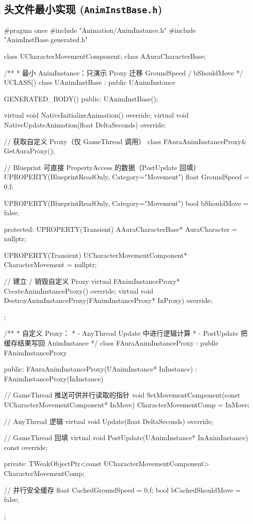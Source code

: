 \documentclass[10pt,openright,oneside,CJKmath]{MyBook}
\begin{document}
\subsection{头文件最小实现 (\texttt{AnimInstBase.h})}
\begin{code}[caption={AnimInstBase.h}]
#pragma once
#include "Animation/AnimInstance.h"
#include "AnimInstBase.generated.h"

class UCharacterMovementComponent;
class AAuraCharacterBase;

/**
 * 最小 AnimInstance：只演示 Proxy 迁移 GroundSpeed / bShouldMove
 */
UCLASS()
class UAnimInstBase : public UAnimInstance
{
    GENERATED_BODY()
public:
    UAnimInstBase();

    virtual void NativeInitializeAnimation() override;
    virtual void NativeUpdateAnimation(float DeltaSeconds) override;

    // 获取自定义 Proxy（仅 GameThread 调用）
    class FAuraAnimInstanceProxy& GetAuraProxy();

    // Blueprint 可直接 PropertyAccess 的数据（PostUpdate 回填）
    UPROPERTY(BlueprintReadOnly, Category="Movement")
    float GroundSpeed = 0.f;

    UPROPERTY(BlueprintReadOnly, Category="Movement")
    bool bShouldMove = false;

protected:
    UPROPERTY(Transient)
    AAuraCharacterBase* AuraCharacter = nullptr;

    UPROPERTY(Transient)
    UCharacterMovementComponent* CharacterMovement = nullptr;

    // 建立 / 销毁自定义 Proxy
    virtual FAnimInstanceProxy* CreateAnimInstanceProxy() override;
    virtual void DestroyAnimInstanceProxy(FAnimInstanceProxy* InProxy) override;
};

/**
 * 自定义 Proxy：
 *  - AnyThread Update 中进行逻辑计算
 *  - PostUpdate 把缓存结果写回 AnimInstance
 */
class FAuraAnimInstanceProxy : public FAnimInstanceProxy
{
public:
    FAuraAnimInstanceProxy(UAnimInstance* InInstance)
        : FAnimInstanceProxy(InInstance) {}

    // GameThread 推送可供并行读取的指针
    void SetMovementComponent(const UCharacterMovementComponent* InMove)
    {
        CharacterMovementComp = InMove;
    }

    // AnyThread 逻辑
    virtual void Update(float DeltaSeconds) override;

    // GameThread 回填
    virtual void PostUpdate(UAnimInstance* InAnimInstance) const override;

private:
    TWeakObjectPtr<const UCharacterMovementComponent> CharacterMovementComp;

    // 并行安全缓存
    float CachedGroundSpeed = 0.f;
    bool  bCachedShouldMove = false;
};
\end{code}
\end{document}
